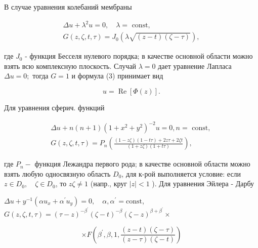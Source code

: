 \documentclass[10pt]{article}
\begin{document}
В случае уравнения колебаний мембраны



\[

\begin{gathered}

\Delta u+\lambda^{2} u=0, \quad \lambda=\text { const, } \\

G(z, \zeta, t, \tau)=J_{0}(\lambda \sqrt{(z-t)(\zeta-\tau)}),

\end{gathered}

\]



где $J_{0}$ - функция Бесселя нулевого порядка; в качестве основной области можно взять всю комплексную плоскость. Случай $\lambda=0$ дает уравнение Лапласа $\Delta u=0 ;$ тогда $G=1$ и формула (3) принимает вид



\[

u=\operatorname{Re}[\Phi(z)] .

\]



Для уравнения сферич. функций



\[

\begin{gathered}

\Delta u+n(n+1)\left(1+x^{2}+y^{2}\right)^{-2} u=0, n=\text { const, } \\

G(z, \zeta, t, \tau)=P_{n}\left(\frac{(1-z \zeta)(1-t \tau)+2 z \tau+2 \zeta t}{(1+z \zeta)(1+t \tau)}\right),

\end{gathered}

\]



где $P_{n}-$ функция Лежандра первого рода; в качестве основной области можно взять любую односвязную область $D_{0}$, для к-рой выполняется условие: если $z \in D_{0}, \quad \zeta \in D_{0}$, то $z \zeta \neq 1$ (напр., круг $|z|<1$ ). Для уравнения Эйлера - Дарбу



$\Delta u+y^{-1}\left(\alpha u_{x}+\alpha^{\prime} u_{y}\right)=0, \quad \alpha, \alpha^{\prime}=\mathrm{const}$, $G(z, \zeta, t, \tau)=(\tau-z)^{-\beta^{\prime}}(\zeta-t)^{-\beta}(\zeta-z)^{\beta+\beta^{\prime}} \times$



\[

\times F\left(\beta^{\prime}, \beta, 1, \frac{(z-t)(\zeta-\tau)}{(z-\tau)(\zeta-t)}\right)

\]
\end{document}
